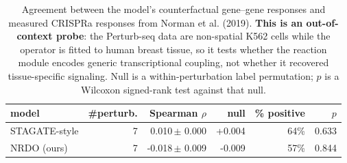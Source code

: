 \begin{table}[htbp]
\centering
\small
\caption{Agreement between the model's counterfactual gene--gene responses and measured CRISPRa responses from Norman et al. (2019). \textbf{This is an out-of-context probe}: the Perturb-seq data are non-spatial K562 cells while the operator is fitted to human breast tissue, so it tests whether the reaction module encodes generic transcriptional coupling, not whether it recovered tissue-specific signaling. Null is a within-perturbation label permutation; $p$ is a Wilcoxon signed-rank test against that null.}
\label{tab:perturbseq}
\begin{tabular}{lrrrrr}
\toprule
model & \#perturb. & Spearman $\rho$ & null & \% positive & $p$\\
\midrule
STAGATE-style & 7 & 0.010\,\tiny{$\pm$ 0.000} & +0.004 & 64\% & 0.633 \\
NRDO (ours) & 7 & -0.018\,\tiny{$\pm$ 0.009} & -0.009 & 57\% & 0.844 \\
\bottomrule
\end{tabular}
\end{table}
